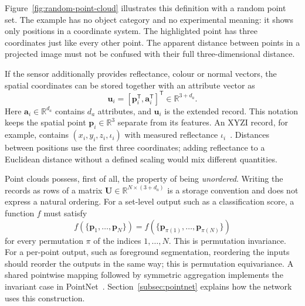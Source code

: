 Figure~\ref{fig:random-point-cloud} illustrates this definition with a
random point set. The example has no object category and no experimental
meaning: it shows only positions in a coordinate system. The highlighted
point has three coordinates just like every other point. The apparent
distance between points in a projected image must not be confused with
their full three-dimensional distance.

If the sensor additionally provides reflectance, colour or normal vectors,
the spatial coordinates can be stored together with an attribute vector as
\begin{equation}
  \mathbf u_i=[\mathbf p_i^{\mathsf T},\mathbf a_i^{\mathsf T}]^{\mathsf T}
  \in\mathbb R^{3+d_a}.
  \label{eq:point_attributes}
\end{equation}
Here $\mathbf a_i\in\mathbb R^{d_a}$ contains $d_a$ attributes, and
$\mathbf u_i$ is the extended record. This notation keeps the spatial
point $\mathbf p_i\in\mathbb R^3$ separate from its features. An XYZI record,
for example, contains $(x_i,y_i,z_i,\iota_i)$ with measured reflectance
$\iota_i$~\cite{geiger2013kitti}. Distances between positions use the first
three coordinates; adding reflectance to a Euclidean distance without a
defined scaling would mix different quantities.

Point clouds possess, first of all, the property of being
\emph{unordered}. Writing the records as rows of a matrix
$\mathbf U\in\mathbb R^{N\times(3+d_a)}$ is a storage convention and
does not express a natural ordering. For a set-level output such as a
classification score, a function $f$ must satisfy
\begin{equation}
 f(\{\mathbf p_1,\ldots,\mathbf p_N\})
 =f(\{\mathbf p_{\pi(1)},\ldots,\mathbf p_{\pi(N)}\})
 \label{eq:permutation_invariance}
\end{equation}
for every permutation $\pi$ of the indices $1,\ldots,N$. This is
permutation invariance. For a per-point output, such as foreground
segmentation, reordering the inputs should reorder the outputs in the same
way; this is permutation equivariance. A shared pointwise mapping followed
by symmetric aggregation implements the invariant case in
PointNet~\cite{qi2017pointnet}. Section~\ref{subsec:pointnet} explains how the network uses this construction.

